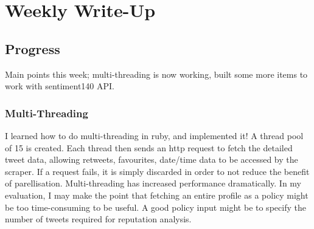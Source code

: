 \chapter{Weekly Write-Up}\label{C:us}

\section{Progress}

Main points this week; multi-threading is now working, built some more items to work with sentiment140 API.\\

\subsection{Multi-Threading} I learned how to do multi-threading in ruby, and implemented it! A thread pool of 15 is created. Each thread then sends an http request to fetch the detailed tweet data, allowing retweets, favourites, date/time data to be accessed by the scraper. If a request fails, it is simply discarded in order to not reduce the benefit of parellisation. Multi-threading has increased performance dramatically. In my evaluation, I may make the point that fetching an entire profile as a policy might be too time-consuming to be useful. A good policy input might be to specify the number of tweets required for reputation analysis. 

